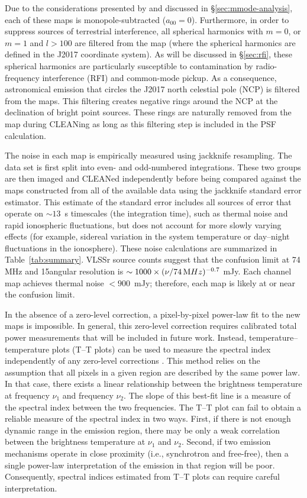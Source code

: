 \begin{bibunit}
Due to the considerations presented by \citet{2016ApJ...826..116V} and discussed in
\S\ref{sec:mmode-analysis}, each of these maps is monopole-subtracted ($a_{00}=0$).  Furthermore, in
order to suppress sources of terrestrial interference, all spherical harmonics with $m=0$, or $m=1$
and $l>100$ are filtered from the map (where the spherical harmonics are defined in the J2017
coordinate system). As will be discussed in \S\ref{sec:rfi}, these spherical harmonics are
particularly susceptible to contamination by radio-frequency interference (RFI) and common-mode
pickup. As a consequence, astronomical emission that circles the J2017 north celestial pole (NCP) is
filtered from the maps.  This filtering creates negative rings around the NCP at the declination of
bright point sources.  These rings are naturally removed from the map during CLEANing as long as
this filtering step is included in the PSF calculation.

The noise in each map is empirically measured using jackknife resampling. The data set is first split
into even- and odd-numbered integrations. These two groups are then imaged and CLEANed
independently before being compared against the maps constructed from all of the available data
using the jackknife standard error estimator. This estimate of the standard error includes all
sources of error that operate on $\sim13$~s timescales (the integration time), such as thermal
noise and rapid ionospheric fluctuations, but does not account for more slowly varying effects (for
example, sidereal variation in the system temperature or day--night fluctuations in the ionosphere).
These noise calculations are summarized in Table~\ref{tab:summary}.  VLSSr source counts
\citep{2014MNRAS.440..327L} suggest that the confusion limit at 74 MHz and 15\arcmin angular
resolution is $\sim 1000\times(\nu/74\,{\rm MHz})^{-0.7}$ mJy.  Each channel map achieves thermal
noise $<900$~mJy; therefore, each map is likely at or near the confusion limit.

In the absence of a zero-level correction, a pixel-by-pixel power-law fit to the new maps is
impossible. In general, this zero-level correction requires calibrated total power measurements that
will be included in future work.  Instead, temperature--temperature plots (T--T plots) can be used
to measure the spectral index independently of any zero-level corrections
\citep{1962MNRAS.124..297T}.  This method relies on the assumption that all pixels in a given region
are described by the same power law. In that case, there exists a linear relationship between the
brightness temperature at frequency $\nu_1$ and frequency $\nu_2$. The slope of this best-fit line
is a measure of the spectral index between the two frequencies. The T--T plot can fail to obtain a
reliable measure of the spectral index in two ways.  First, if there is not enough dynamic range in
the emission region, there may be only a weak correlation between the brightness temperature at
$\nu_1$ and $\nu_2$.  Second, if two emission mechanisms operate in close proximity (i.e.,
synchrotron and free-free), then a single power-law interpretation of the emission in that region
will be poor. Consequently, spectral indices estimated from T--T plots can require careful
interpretation.


\end{bibunit}

